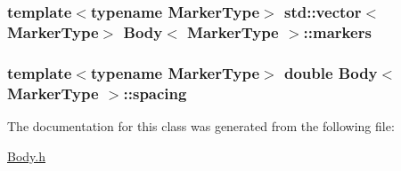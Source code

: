 \subsubsection[{\texorpdfstring{markers}{markers}}]{\setlength{\rightskip}{0pt plus 5cm}template$<$typename Marker\+Type$>$ std\+::vector$<$Marker\+Type$>$ {\bf Body}$<$ Marker\+Type $>$\+::markers\hspace{0.3cm}{\ttfamily [protected]}}\hypertarget{class_body_a4e0ac821f2331ec67793a44e36c855e3}{}\label{class_body_a4e0ac821f2331ec67793a44e36c855e3}
\subsubsection[{\texorpdfstring{spacing}{spacing}}]{\setlength{\rightskip}{0pt plus 5cm}template$<$typename Marker\+Type$>$ double {\bf Body}$<$ Marker\+Type $>$\+::spacing\hspace{0.3cm}{\ttfamily [protected]}}\hypertarget{class_body_a1d4ac2e6fdbc946d5eab0973fd78770b}{}\label{class_body_a1d4ac2e6fdbc946d5eab0973fd78770b}


The documentation for this class was generated from the following file\+:\begin{DoxyCompactItemize}
\item 
\hyperlink{_body_8h}{Body.\+h}\end{DoxyCompactItemize}
